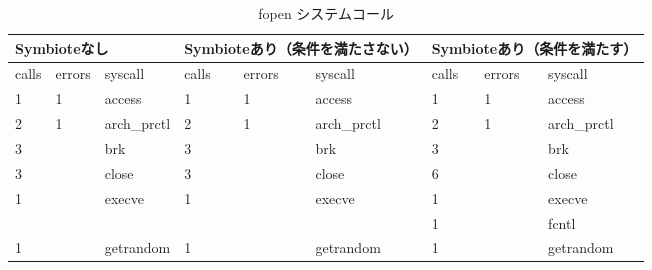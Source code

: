 \documentclass[submit,techreq,noauthor]{eco}	%
\begin{document}
\begin{table}[t]
  \centering
  \caption{fopen システムコール}
  \label{table: fopen}
  \begin{tabular}{|lll|lll|lll|}
  \hline
  \multicolumn{3}{|l|}{Symbioteなし}                                              & \multicolumn{3}{l|}{Symbioteあり（条件を満たさない）}                                    & \multicolumn{3}{l|}{Symbioteあり（条件を満たす）}                                      \\ \hline
  \multicolumn{1}{|l|}{calls} & \multicolumn{1}{l|}{errors} & syscall           & \multicolumn{1}{l|}{calls} & \multicolumn{1}{l|}{errors} & syscall           & \multicolumn{1}{l|}{calls} & \multicolumn{1}{l|}{errors} & syscall           \\ \hline
  \multicolumn{1}{|l|}{1}     & \multicolumn{1}{l|}{1}      & access            & \multicolumn{1}{l|}{1}     & \multicolumn{1}{l|}{1}      & access            & \multicolumn{1}{l|}{1}     & \multicolumn{1}{l|}{1}      & access            \\
  \multicolumn{1}{|l|}{2}     & \multicolumn{1}{l|}{1}      & arch\_prctl       & \multicolumn{1}{l|}{2}     & \multicolumn{1}{l|}{1}      & arch\_prctl       & \multicolumn{1}{l|}{2}     & \multicolumn{1}{l|}{1}      & arch\_prctl       \\
  \multicolumn{1}{|l|}{3}     & \multicolumn{1}{l|}{}       & brk               & \multicolumn{1}{l|}{3}     & \multicolumn{1}{l|}{}       & brk               & \multicolumn{1}{l|}{3}     & \multicolumn{1}{l|}{}       & brk               \\
  \multicolumn{1}{|l|}{3}     & \multicolumn{1}{l|}{}       & close             & \multicolumn{1}{l|}{3}     & \multicolumn{1}{l|}{}       & close             & \multicolumn{1}{l|}{6}     & \multicolumn{1}{l|}{}       & close             \\
  \multicolumn{1}{|l|}{1}     & \multicolumn{1}{l|}{}       & execve            & \multicolumn{1}{l|}{1}     & \multicolumn{1}{l|}{}       & execve            & \multicolumn{1}{l|}{1}     & \multicolumn{1}{l|}{}       & execve            \\
  \multicolumn{1}{|l|}{}      & \multicolumn{1}{l|}{}       &                   & \multicolumn{1}{l|}{}      & \multicolumn{1}{l|}{}       &                   & \multicolumn{1}{l|}{1}     & \multicolumn{1}{l|}{}       & fcntl             \\
  \multicolumn{1}{|l|}{1}     & \multicolumn{1}{l|}{}       & getrandom         & \multicolumn{1}{l|}{1}     & \multicolumn{1}{l|}{}       & getrandom         & \multicolumn{1}{l|}{1}     & \multicolumn{1}{l|}{}       & getrandom         \\

\end{tabular}
\end{table}
\end{document}
